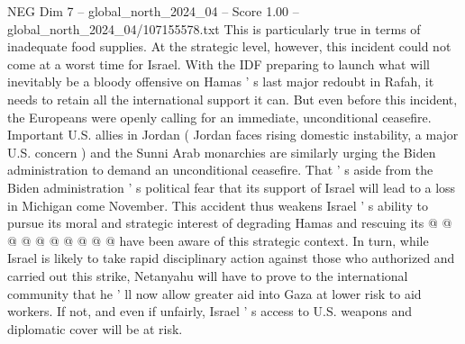 \begin{textsample}{NEG Dim 7 – global\_north\_2024\_04 – Score 1.00 – global\_north\_2024\_04/107155578.txt}
This is particularly true in terms of inadequate food supplies.
At the strategic level, however, this incident could not come at a worst time for Israel.
With the IDF preparing to launch what will inevitably be a bloody offensive on Hamas ' s last major redoubt in Rafah, it needs to retain all the international support it can.
But even before this incident, the Europeans were openly calling for an immediate, unconditional ceasefire.
Important U.S. allies in Jordan ( Jordan faces rising domestic instability, a major U.S. concern ) and the Sunni Arab monarchies are similarly urging the Biden administration to demand an unconditional ceasefire.
That ' s aside from the Biden administration ' s political fear that its support of Israel will lead to a loss in Michigan come November.
This accident thus weakens Israel ' s ability to pursue its moral and strategic interest of degrading Hamas and rescuing its @ @ @ @ @ @ @ @ @ @ have been aware of this strategic context.
In turn, while Israel is likely to take rapid disciplinary action against those who authorized and carried out this strike, Netanyahu will have to prove to the international community that he ' ll now allow greater aid into Gaza at lower risk to aid workers.
If not, and even if unfairly, Israel ' s access to U.S. weapons and diplomatic cover will be at risk.

\end{textsample}
